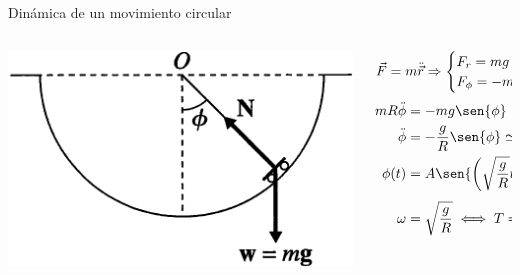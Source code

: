 \documentclass[serif]{beamer}
\begin{document}
\begin{frame}
\begin{block}{Dinámica de un movimiento circular}
\begin{columns}[c]
	\begin{column}{0.35\textwidth}
		\includegraphics[width=\textwidth]{taylor1_14}
	\end{column}
  \begin{column}{0.65\textwidth}
		\[
			\vec{F}= m \ddot{\vec{r}} \Rightarrow
			\begin{cases}
				F_r = m g \cos{\phi} - N = -m R \dot{\phi}^2\\
				F_\phi = -m g \sen{\phi} = m R \ddot{\phi}
			\end{cases}
		\]
		\pause
		\begin{align*}
			m R \ddot{\phi} & = -m g \sen{\phi} \\
			\ddot{\phi} & = - \frac{g}{R} \sen{\phi} \simeq - \frac{g}{R} \phi\, (\phi \simeq 0)\\
			\phi(t) & = A \sen{\left( \sqrt{\frac{g}{R}} t \right) }+ B \cos(\sqrt{\frac{g}{R}} t) \\
			\omega & =  \sqrt{\frac{g}{R}} \iff T = \frac{2\pi}{\omega}= 2\pi \sqrt{\frac{R}{g}}  
		\end{align*}
	\end{column}
\end{columns}
\end{block}
\end{frame}
\end{document}
